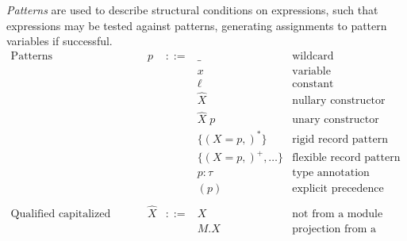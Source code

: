 \documentclass{article}
\begin{document}
\emph{Patterns} are used to describe structural conditions on expressions, such that expressions may be tested against patterns, generating assignments to pattern variables if successful.
$$\begin{array}{rrcll}
  \textrm{Patterns} & p &::=& \_ & \textrm{wildcard} \\
  &&& x & \textrm{variable} \\
  &&& \ell & \textrm{constant} \\
  &&& \hat{X} & \textrm{nullary constructor} \\
  &&& \hat{X} \; p & \textrm{unary constructor} \\
  &&& \{(X = p,)^*\} & \textrm{rigid record pattern} \\
  &&& \{(X = p,)^+, \ldots\} & \textrm{flexible record pattern} \\
  &&& p : \tau & \textrm{type annotation} \\
  &&& (p) & \textrm{explicit precedence} \\
  \\
  \textrm{Qualified capitalized variables} & \hat{X} &::=& X & \textrm{not from a module} \\
  &&& M.X & \textrm{projection from a module} \\
\end{array}$$
\end{document}
